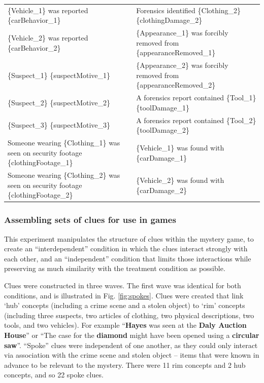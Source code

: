 \documentclass{article}
\begin{document}
\begin{landscape}
\begin{table}[]
\begin{tabular}{ll}
\{Vehicle\_1\}   was reported \{carBehavior\_1\} & Forensics identified   \{Clothing\_2\} \{clothingDamage\_2\} \\
\{Vehicle\_2\}   was reported \{carBehavior\_2\} & \{Appearance\_1\} was forcibly   removed from \{appearanceRemoved\_1\} \\
\{Suspect\_1\}   \{suspectMotive\_1\} & \{Appearance\_2\} was forcibly   removed from \{appearanceRemoved\_2\} \\
\{Suspect\_2\}   \{suspectMotive\_2\} & A forensics report contained   \{Tool\_1\} \{toolDamage\_1\} \\
\{Suspect\_3\}   \{suspectMotive\_3\} & A forensics report contained   \{Tool\_2\} \{toolDamage\_2\} \\
Someone   wearing \{Clothing\_1\} was seen on security footage \{clothingFootage\_1\} & \{Vehicle\_1\} was found with   \{carDamage\_1\} \\
Someone   wearing \{Clothing\_2\} was seen on security footage \{clothingFootage\_2\} & \{Vehicle\_2\} was found with   \{carDamage\_2\}
\end{tabular}
\end{table}

\end{landscape}
\restoregeometry

\subsubsection{Assembling sets of clues for use in games}
This experiment manipulates the structure of clues within the mystery game, to create an ``interdependent'' condition in which the clues interact strongly with each other, and an ``independent'' condition that limits those interactions while preserving as much similarity with the treatment condition as possible. 

Clues were constructed in three waves. The first wave was identical for both conditions, and is illustrated in Fig. \ref{fig:spokes}. Clues were created that link ‘hub’ concepts (including a crime scene and a stolen object) to ‘rim’ concepts (including three suspects, two articles of clothing, two physical descriptions, two tools, and two vehicles). For example “\textbf{Hayes} was seen at the \textbf{Daly Auction House}” or “The case for the \textbf{diamond} might have been opened using a \textbf{circular saw}”. “Spoke” clues were independent of one another, as they could only interact via association with the crime scene and stolen object – items that were known in advance to be relevant to the mystery. There were 11 rim concepts and 2 hub concepts, and so 22 spoke clues.
\end{document}
